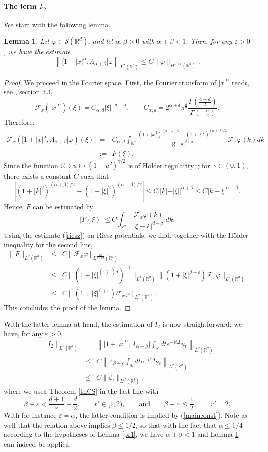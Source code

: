 \documentclass[12pt]{article}
\newtheorem{lemma}[theorem]{Lemma}
\def \Rm {\mathbb R}
\newcommand{\eps}{\varepsilon}
\newcommand{\calF}{\mathcal F}
\newcommand{\calS}{\mathcal S}
\def\fref#1{{\rm (\ref{#1})}}
\newcommand{\bee}{\begin{eqnarray*}}
\newcommand{\eee}{\end{eqnarray*}}
\begin{document}
\paragraph{The term $I_2$.} We start with the following lemma.
\begin{lemma} \label{com} Let $\varphi \in \calS(\Rm^{d})$, and let $\alpha,\beta>0$ with $\alpha+\beta<1$. Then, for any $\eps>0$, we have the estimate
$$
\left\| \big[1+|x|^\alpha,\Lambda_{\alpha+\beta}\big] \varphi \right \|_{L^2(\Rm^{d})} \leq C \| \varphi \|_{H^{\beta+\eps}(\Rm^d)}.$$
\end{lemma}
\begin{proof}
We proceed in the Fourier space. First, the Fourier transform of $|x|^\alpha$ reads, see \cite{gelfand}, section 3.3,
$$
\calF_x(|x|^\alpha)(\xi)= C_{\alpha,d} |\xi|^{-d-\alpha}, \qquad C_{\alpha,d}= 2^{\alpha+d} \pi^{\frac{d}{2}} \frac{\Gamma(\frac{\alpha+d}{2})}{\Gamma(-\frac{\alpha}{2})}.
$$
Therefore,
\bee
\calF_x \left(\big[1+|x|^\alpha,\Lambda_{\alpha+\beta}\big ]\varphi\right)(\xi)&=&C_{\alpha,d}\int_{\Rm^d} \frac{(1+|k|^2)^{(\alpha+\beta)/2}-(1+|\xi|^2)^{(\alpha+\beta)/2}}{|\xi-k|^{d+\alpha}} \calF_x \varphi(k) dk\\
&:=&F(\xi).
\eee
Since the function $ \Rm \ni u \mapsto (1+u^2)^{\gamma/2}$ is of H\"older regularity $\gamma$ for $\gamma \in (0,1)$, there exists a constant $C$ such that
$$
|(1+|k|^2)^{(\alpha+\beta)/2}-(1+|\xi|^2)^{(\alpha+\beta)/2}| \leq C||k|-|\xi||^{\alpha+\beta} \leq C |k-\xi|^{\alpha+\beta}.
$$ 
Hence, $F$ can be estimated by 
$$
|F(\xi)|\leq C \int_{\Rm^d} \frac{|\calF_x \varphi(k)| }{|\xi-k|^{d-\beta}} dk.
$$
Using the estimate \fref{riesz} on Riesz potentials, we find, together with the H\"older inequality for the second line,
\bee
\|F\|_{L^2(\Rm^d)} &\leq& C \| \calF_x \varphi\|_{L^{\frac{2d}{d+2\beta}}(\Rm^d)}\\
&\leq & C \|(1+|\xi|^{(\frac{\beta+\eps}{\beta})d})^{-1}\|_{L^1(\Rm^d)}  \| (1+|\xi|^{\beta+\eps})\calF_x \varphi\|_{L^{2}(\Rm^d)}\\[2mm]
&\leq & C \| (1+|\xi|^{\beta+\eps})\calF_x \varphi\|_{L^{2}(\Rm^d)}.
\eee
This concludes the proof of the lemma.
\end{proof}

\medskip

With the latter lemma at hand, the estimation of $I_2$ is now straightforward: we have, for any $\eps>0$,
\bee
\|I_2\|_{L^2(\Rm^d)}&=&\left\|\big[1+|x|^\alpha,\Lambda_{\alpha+\beta}\big] \int_{\Rm } dt e^{-i t \Delta} u_t \right\|_{L^2(\Rm^d)}\\
& \leq& C \left\| \Lambda_{\beta+\eps} \int_{\Rm } dt e^{-i t \Delta} u_t \right\|_{L^2(\Rm^d)}\\
&\leq & C \| \phi_t\|_{L^{r'}(\Rm^d)},
\eee
where we used Theorem \ref{thCS} in the last line with
$$
\beta+\eps < \frac{d+1}{r}-\frac{d}{2}, \qquad r'\in[1,2), \qquad \textrm{and} \qquad \beta+\alpha \leq \frac{1}{2}, \qquad r'=2.
$$
With for instance $\eps=\alpha$, the latter condition is implied by \fref{mainconst}. Note as well that the relation above implies $\beta \leq 1/2$, so that with the fact that $\alpha \leq 1/4$ according to the hypotheses of Lemma \ref{pr1}, we have $\alpha+\beta<1$ and Lemma \ref{com} can indeed be applied. 
\end{document}
